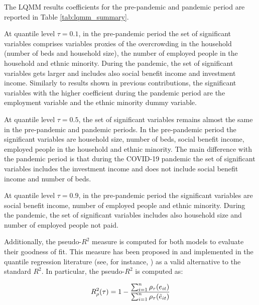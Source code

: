 \noindent The LQMM results coefficients for the pre-pandemic and pandemic period are reported in Table \ref{tab:lqmm_summary}.

\vspace{0.15in}

\noindent At quantile level $\tau=0.1$, in the pre-pandemic period the set of significant variables comprises variables proxies of the overcrowding in the household (number of beds and household size), the number of employed people in the household and ethnic minority. During the pandemic, the set of significant variables gets larger and includes also social benefit income and investment income. Similarly to results shown in previous contributions, the significant variables with the higher coefficient during the pandemic period are the employment variable and the ethnic minority dummy variable.

\vspace{0.15in}

\noindent At quantile level $\tau=0.5$, the set of significant variables remains almost the same in the pre-pandemic and pandemic periods. In the pre-pandemic period the significant variables are household size, number of beds, social benefit income, employed people in the household and ethnic minority. The main difference with the pandemic period is that during the COVID-19 pandemic the set of significant variables includes the investment income and does not include social benefit income and number of beds. 

\vspace{0.15in}

\noindent At quantile level $\tau=0.9$, in the pre-pandemic period the significant variables are social benefit income, number of employed people and ethnic minority. During the pandemic, the set of significant variables includes also household size and number of employed people not paid.

\vspace{0.15in}

\noindent Additionally, the pseudo-$R^2$ measure is computed for both models to evaluate their goodness of fit. This measure has been proposed in \cite{koenker1999goodness} and implemented in the quantile regression literature (see, for instance, \cite{bianchi2018estimation, borgoni2024semiparametric}) as a valid alternative to the standard $R^2$. In particular, the pseudo-$R^2$ is computed as:

\begin{equation}
R^2_{\rho}(\tau)=1-\frac{\sum_{i=1}^{n}\rho_{\tau}(e_{it})}{\sum_{i=1}^{n}\rho_{\tau}(\Tilde{e}_{it})}
\end{equation}

